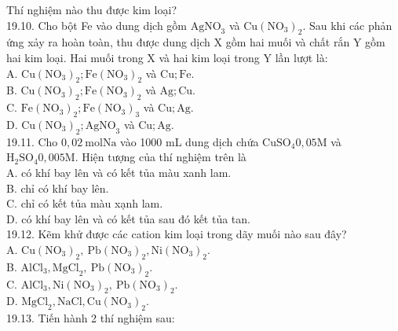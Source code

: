 \documentclass[10pt]{article}
\begin{document}
Thí nghiệm nào thu được kim loại?\\
19.10. Cho bột Fe vào dung dịch gồm $\mathrm{AgNO}_{3}$ và $\mathrm{Cu}\left(\mathrm{NO}_{3}\right)_{2}$. Sau khi các phản ứng xảy ra hoàn toàn, thu được dung dịch X gồm hai muối và chất rắn Y gồm hai kim loại. Hai muối trong X và hai kim loại trong Y lần lượt là:\\
A. $\mathrm{Cu}\left(\mathrm{NO}_{3}\right)_{2} ; \mathrm{Fe}\left(\mathrm{NO}_{3}\right)_{2}$ và $\mathrm{Cu} ; \mathrm{Fe}$.\\
B. $\mathrm{Cu}\left(\mathrm{NO}_{3}\right)_{2} ; \mathrm{Fe}\left(\mathrm{NO}_{3}\right)_{2}$ và $\mathrm{Ag} ; \mathrm{Cu}$.\\
C. $\mathrm{Fe}\left(\mathrm{NO}_{3}\right)_{2} ; \mathrm{Fe}\left(\mathrm{NO}_{3}\right)_{3}$ và $\mathrm{Cu} ; \mathrm{Ag}$.\\
D. $\mathrm{Cu}\left(\mathrm{NO}_{3}\right)_{2} ; \mathrm{AgNO}_{3}$ và $\mathrm{Cu} ; \mathrm{Ag}$.\\
19.11. Cho $0,02 \mathrm{~mol} \mathrm{Na}$ vào 1000 mL dung dịch chứa $\mathrm{CuSO}_{4} 0,05 \mathrm{M}$ và $\mathrm{H}_{2} \mathrm{SO}_{4} 0,005 \mathrm{M}$. Hiện tượng của thí nghiệm trên là\\
A. có khí bay lên và có kết tủa màu xanh lam.\\
B. chỉ có khí bay lên.\\
C. chỉ có kết tủa màu xạnh lam.\\
D. có khí bay lên và có kết tủa sau đó kết tủa tan.\\
19.12. Kẽm khử được các cation kim loại trong dãy muối nào sau đây?\\
A. $\mathrm{Cu}\left(\mathrm{NO}_{3}\right)_{2}, \mathrm{~Pb}\left(\mathrm{NO}_{3}\right)_{2}, \mathrm{Ni}\left(\mathrm{NO}_{3}\right)_{2}$.\\
B. $\mathrm{AlCl}_{3}, \mathrm{MgCl}_{2}, \mathrm{~Pb}\left(\mathrm{NO}_{3}\right)_{2}$.\\
C. $\mathrm{AlCl}_{3}, \mathrm{Ni}\left(\mathrm{NO}_{3}\right)_{2}, \mathrm{~Pb}\left(\mathrm{NO}_{3}\right)_{2}$.\\
D. $\mathrm{MgCl}_{2}, \mathrm{NaCl}, \mathrm{Cu}\left(\mathrm{NO}_{3}\right)_{2}$.\\
19.13. Tiến hành 2 thí nghiệm sau:
\end{document}
